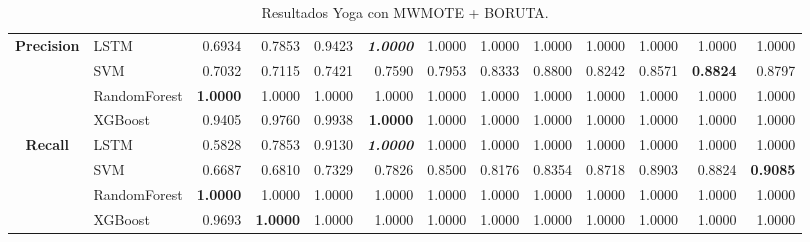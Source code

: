\begin{table}[H]
\begin{adjustbox}{max width=14cm}
\begin{tabular}{|c|l|r|r|r|r|r|r|r|r|r|r|r|}
			\hline
			\textbf{Precision} &  LSTM &  0.6934 &  0.7853 &  0.9423 & \textit{ \textbf{  1.0000 } } &  1.0000 &  1.0000 &  1.0000 &  1.0000 &  1.0000 &  1.0000 &  1.0000 \\
			&  SVM &  0.7032 &  0.7115 &  0.7421 &  0.7590 &  0.7953 &  0.8333 &  0.8800 &  0.8242 &  0.8571 & \textbf{  0.8824 } &  0.8797 \\
			&  RandomForest & \textbf{  1.0000 } &  1.0000 &  1.0000 &  1.0000 &  1.0000 &  1.0000 &  1.0000 &  1.0000 &  1.0000 &  1.0000 &  1.0000 \\
			&  XGBoost &  0.9405 &  0.9760 &  0.9938 & \textbf{  1.0000 } &  1.0000 &  1.0000 &  1.0000 &  1.0000 &  1.0000 &  1.0000 &  1.0000 \\
			\hline
			\textbf{Recall} &  LSTM &  0.5828 &  0.7853 &  0.9130 & \textit{ \textbf{  1.0000 } } &  1.0000 &  1.0000 &  1.0000 &  1.0000 &  1.0000 &  1.0000 &  1.0000 \\
			&  SVM &  0.6687 &  0.6810 &  0.7329 &  0.7826 &  0.8500 &  0.8176 &  0.8354 &  0.8718 &  0.8903 &  0.8824 & \textbf{  0.9085 } \\
			&  RandomForest & \textbf{  1.0000 } &  1.0000 &  1.0000 &  1.0000 &  1.0000 &  1.0000 &  1.0000 &  1.0000 &  1.0000 &  1.0000 &  1.0000 \\
			&  XGBoost &  0.9693 & \textbf{  1.0000 } &  1.0000 &  1.0000 &  1.0000 &  1.0000 &  1.0000 &  1.0000 &  1.0000 &  1.0000 &  1.0000 \\
			\hline
		\end{tabular}
	\end{adjustbox}
	\caption{Resultados Yoga con MWMOTE + BORUTA.}
	\label{tab:Yoga_MWMOTE_BORUTA}
\end{table}


